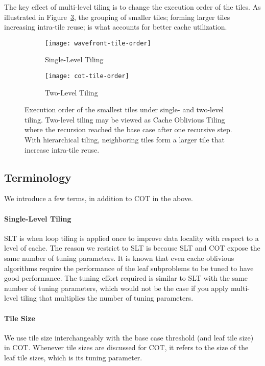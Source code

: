 The key effect of multi-level tiling is to change the execution order of the
tiles. As illustrated in Figure~\ref{fig:tile-order}, the grouping of smaller
tiles; forming larger tiles increasing intra-tile reuse; is what accounts for
better cache utilization.


\begin{figure}
\centering
  \begin{subfigure}{0.2\textwidth}
    \texttt{[image: wavefront-tile-order]}
    \caption{Single-Level Tiling \label{fig:wavefront-tile-order}}
  \end{subfigure}
  \begin{subfigure}{0.2\textwidth}
    \texttt{[image: cot-tile-order]}
    \caption{Two-Level Tiling \label{fig:cot-tile-order}}
  \end{subfigure}
  \caption{\label{fig:tile-order}Execution order of the smallest tiles under single- and two-level
tiling. Two-level tiling may be viewed as Cache Oblivious Tiling where the
recursion reached the base case after one recursive step. With hierarchical tiling,
neighboring tiles form a larger tile that increase intra-tile reuse.
\vspace{-0.2cm}
}
\end{figure}


\subsection{Terminology}\label{sec:terminology}
We introduce a few terms, in addition to COT in the above.

\paragraph{Single-Level Tiling} SLT is when loop tiling is applied once to
improve data locality with respect to a level of cache. The reason we restrict
to SLT is because SLT and COT expose the same number of tuning parameters. It
is known that even cache oblivious algorithms require the performance of the
leaf subproblems to be tuned to have good performance. The tuning effort
required is similar to SLT with the same number of tuning parameters, which
would not be the case if you apply multi-level tiling that multiplies the
number of tuning parameters.  

\paragraph{Tile Size} We use tile size interchangeably with the base case
threshold (and leaf tile size) in COT. Whenever tile sizes are discussed for
COT, it refers to the size of the leaf tile sizes, which is its tuning parameter. 

